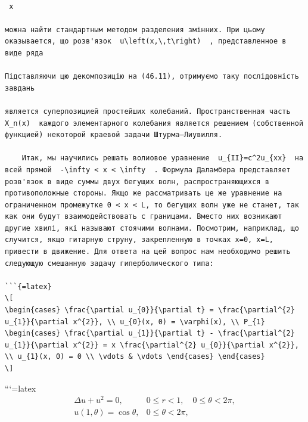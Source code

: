 \documentclass[
  ukrainian,
]{article}
\begin{document}
\begin{verbatim}

 x

можна найти стандартным методом разделения змінних. При цьому оказывается, що розв'язок  u\left(x,\,t\right)  , представленное в виде ряда

Підставляючи цю декомпозицію на (46.11), отримуємо таку послідовність завдань

является суперпозицией простейших колебаний. Пространственная часть  X_n(x)  каждого элементарного колебания является решением (собственной функцией) некоторой краевой задачи Штурма—Лиувилля.

    Итак, мы научились решать волиовое уравнение  u_{II}=c^2u_{xx}  на всей прямой  -\infty < x < \infty  . Формула Даламбера представляет розв'язок в виде суммы двух бегущих волн, распространяющихся в противоположные стороны. Якщо же рассматривать це же уравнение на ограниченном промежутке 0 < x < L, то бегущих волн уже не станет, так как они будут взаимодействовать с границами. Вместо них возникают другие хвилі, які называют стоячими волнами. Посмотрим, наприклад, що случится, якщо гитарную струну, закрепленную в точках x=0, x=L, привести в движение. Для ответа на цей вопрос нам необходимо решить следующую смешанную задачу гиперболического типа:

```{=latex}
\[
\begin{cases} \frac{\partial u_{0}}{\partial t} = \frac{\partial^{2} u_{1}}{\partial x^{2}}, \\ u_{0}(x, 0) = \varphi(x), \\ P_{1} \begin{cases} \frac{\partial u_{1}}{\partial t} - \frac{\partial^{2} u_{1}}{\partial x^{2}} = x \frac{\partial^{2} u_{0}}{\partial x^{2}}, \\ u_{1}(x, 0) = 0 \\ \vdots & \vdots \end{cases} \end{cases}
\]
\end{verbatim}

```{=latex}
\[
\begin{aligned} \Delta u + u^2 = 0, & 0 \leqslant r < 1, \quad 0 \leqslant \theta < 2\pi, \\ u(1, \theta) = \cos \theta, & 0 \leqslant \theta < 2\pi, \end{aligned}
\]
\end{document}
